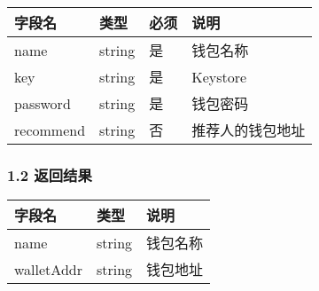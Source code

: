 \documentclass[letterpaper,10pt,english]{sphinxmanual}
\begin{document}


\begin{savenotes}\sphinxattablestart
\centering
\begin{tabulary}{\linewidth}[t]{|T|T|T|T|}
\hline
\sphinxstyletheadfamily 
字段名
&\sphinxstyletheadfamily 
类型
&\sphinxstyletheadfamily 
必须
&\sphinxstyletheadfamily 
说明
\\
\hline
name
&
string
&
是
&
钱包名称
\\
\hline
key
&
string
&
是
&
Keystore
\\
\hline
password
&
string
&
是
&
钱包密码
\\
\hline
recommend
&
string
&
否
&
推荐人的钱包地址
\\
\hline
\end{tabulary}
\par
\sphinxattableend\end{savenotes}


\subsubsection{1.2 返回结果}
\label{\detokenize{BCBWalletSDK_u63a5_u53e3_u8bf4_u660e:id25}}

\begin{sphinxVerbatim}[commandchars=\\\{\}]
     
\end{sphinxVerbatim}



\begin{savenotes}\sphinxattablestart
\centering
\begin{tabulary}{\linewidth}[t]{|T|T|T|}
\hline
\sphinxstyletheadfamily 
字段名
&\sphinxstyletheadfamily 
类型
&\sphinxstyletheadfamily 
说明
\\
\hline
name
&
string
&
钱包名称
\\
\hline
walletAddr
&
string
&
钱包地址
\\
\hline
\end{tabulary}
\par
\sphinxattableend\end{savenotes}
\end{document}
